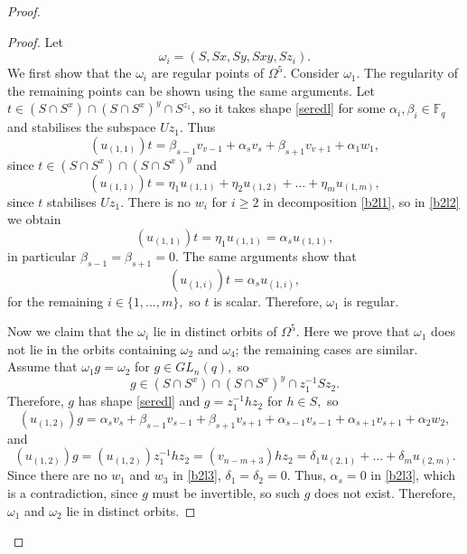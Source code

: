 \begin{proof}
\begin{proof}
Let $$\omega_i=(S,Sx,Sy,Sxy,Sz_i).$$ We  first show that the $\omega_i$ are regular points of $\Omega^5$. Consider $\omega_1$. The regularity of the remaining points can be shown using the same arguments. Let $t \in (S \cap S^x) \cap (S \cap S^x)^y \cap S^{z_1}$, so it takes shape \eqref{seredl} for some $\alpha_i, \beta_i \in \mathbb{F}_q$ and stabilises the subspace $Uz_1.$ Thus
\begin{equation}\label{b2l1}
(u_{(1,1)})t= \beta_{s-1}v_{v-1}+\alpha_s v_s +\beta_{s+1}v_{v+1} + \alpha_1 w_1,
\end{equation}
since $t \in (S \cap S^x) \cap (S \cap S^x)^y$ and 
\begin{equation}\label{b2l2}
(u_{(1,1)})t=\eta_1 u_{(1,1)} +\eta_2 u_{(1,2)} + \ldots + \eta_m u_{(1,m)},
\end{equation}
since $t$ stabilises  $Uz_1.$ There is no  $w_i$ for $i \ge 2$ in decomposition \eqref{b2l1}, so in \eqref{b2l2} we obtain
$$(u_{(1,1)})t=\eta_1 u_{(1,1)}=\alpha_s u_{(1,1)},$$
in particular $\beta_{s-1}=\beta_{s+1}=0$. The same arguments show that 
$$(u_{(1,i)})t=\alpha_s u_{(1,i)},$$
for the remaining $i \in \{1, \ldots , m\},$
so $t$ is scalar. Therefore, $\omega_1$ is regular.

Now we claim that the $\omega_i$ lie in distinct orbits of $\Omega^5.$ Here we prove that $\omega_1$ does not lie in the orbits containing $\omega_2$ and $\omega_4$; the remaining cases are similar.  Assume that $\omega_1 g =\omega_2$ for $g \in GL_n(q),$ so 
$$g \in (S \cap S^x) \cap (S \cap S^x)^y \cap z_1^{-1}Sz_2.$$
Therefore, $g$ has shape \eqref{seredl} and $g=z_1^{-1}hz_2$ for $h \in S,$ so 
\begin{equation}\label{b2l3}
(u_{(1,2)})g=\alpha_{s}v_{s}+\beta_{s-1}v_{s-1}+\beta_{s+1}v_{s+1} +\alpha_{s-1}v_{s-1}+\alpha_{s+1}v_{s+1} + \alpha_2 w_2,
\end{equation}
and 
\begin{equation}\label{b2l4}
(u_{(1,2)})g=(u_{(1,2)})z_1^{-1}hz_2=(v_{n-m+3})hz_2 = \delta_1 u_{(2,1)} + \ldots + \delta_m u_{(2,m)}.
\end{equation}
Since there are no $w_1$ and $w_3$ in \eqref{b2l3}, $\delta_1=\delta_2=0$. Thus, $\alpha_s=0$ in \eqref{b2l3}, which is a contradiction, since $g$ must be invertible, so such $g$ does not exist. Therefore, $\omega_1$ and $\omega_2$ lie in  distinct orbits. 


\end{proof}
\end{proof}
